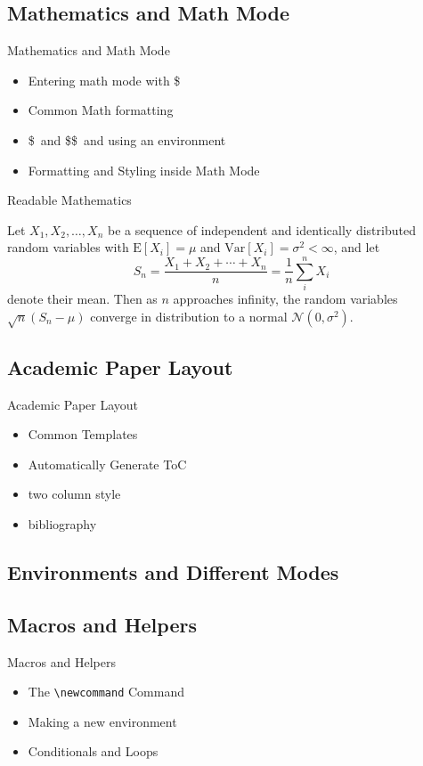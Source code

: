 \documentclass{beamer}
\begin{document}
\subsection{Mathematics and Math Mode}
\begin{frame}{Mathematics and Math Mode}
\begin{itemize}
\item Entering math mode with \$
\item Common Math formatting
\item  \$\ and \$\$\ and using an environment
\item Formatting and Styling inside Math Mode
\end{itemize}
\end{frame}


\begin{frame}{Readable Mathematics}

Let $X_1, X_2, \ldots, X_n$ be a sequence of independent and identically distributed random variables with $\text{E}[X_i] = \mu$ and $\text{Var}[X_i] = \sigma^2 < \infty$, and let
$$S_n = \frac{X_1 + X_2 + \cdots + X_n}{n}
      = \frac{1}{n}\sum_{i}^{n} X_i$$
denote their mean. Then as $n$ approaches infinity, the random variables $\sqrt{n}(S_n - \mu)$ converge in distribution to a normal $\mathcal{N}(0, \sigma^2)$.

\end{frame}

\subsection{Academic Paper Layout}
\begin{frame}{Academic Paper Layout}
\begin{itemize}
\item Common Templates
\item Automatically Generate ToC
\item two column style
\item bibliography
\end{itemize}
\end{frame}

\subsection{Environments and Different Modes}

\subsection{Macros and Helpers}
\begin{frame}{Macros and Helpers}
\begin{itemize}
\item The \texttt{\textbackslash newcommand} Command
\item Making a new environment
\item Conditionals and Loops
\end{itemize}
\end{frame}
\end{document}
